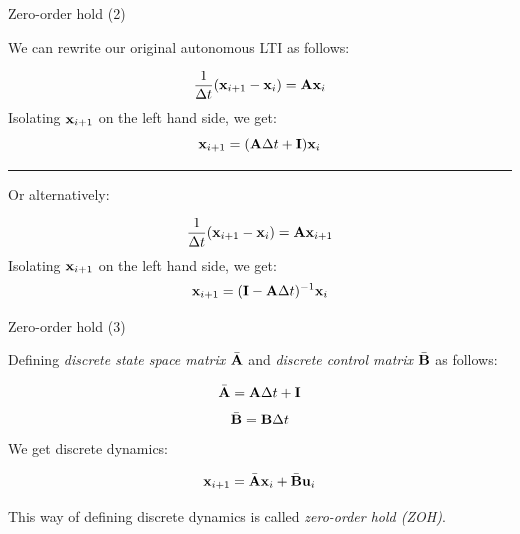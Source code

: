 \documentclass{beamer}
\begin{document}
\begin{frame}{Zero-order hold (2)}
\begin{flushleft}

We can rewrite our original autonomous LTI as follows:

\begin{equation}
\frac{1}{\Delta t}(\mathbf{x}_{i + 1} - \mathbf{x}_i) = \mathbf{A} \mathbf{x}_i
\end{equation}
Isolating $\mathbf{x}_{i + 1}$ on the left hand side, we get:
\begin{equation}
\mathbf{x}_{i + 1} = (\mathbf{A} \Delta t + \mathbf{I}) \mathbf{x}_i
\end{equation}

\noindent\rule{11cm}{0.4pt}

Or alternatively:

\begin{equation}
\frac{1}{\Delta t}(\mathbf{x}_{i + 1} - \mathbf{x}_i) = \mathbf{A} \mathbf{x}_{i + 1}
\end{equation}
Isolating $\mathbf{x}_{i + 1}$ on the left hand side, we get:
\begin{equation}
\mathbf{x}_{i + 1} = (\mathbf{I} - \mathbf{A} \Delta t)^{-1} \mathbf{x}_i 
\end{equation}

\end{flushleft}
\end{frame}




\begin{frame}{Zero-order hold (3)}
\begin{flushleft}

Defining \emph{discrete state space matrix} $\bar{\mathbf{A}}$ and \emph{discrete control matrix} $\bar{\mathbf{B}}$ as follows:

\begin{equation}
\bar{\mathbf{A}} = \mathbf{A} \Delta t + \mathbf{I}
\end{equation}
\begin{equation}
\bar{\mathbf{B}} = \mathbf{B} \Delta t
\end{equation}
%
We get discrete dynamics:

\begin{equation}
\mathbf{x}_{i+1} = \bar{\mathbf{A}} \mathbf{x}_i + \bar{\mathbf{B}} \mathbf u_i
\end{equation}

This way of defining discrete dynamics is called \emph{zero-order hold (ZOH)}.

\end{flushleft}
\end{frame}
\end{document}
